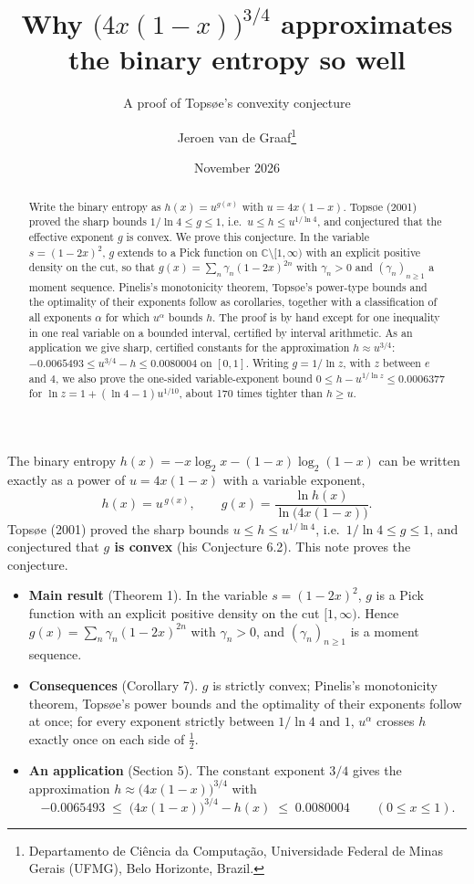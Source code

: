 \documentclass[
  11pt,
]{article}
\title{Why \(\bigl(4x(1-x)\bigr)^{3/4}\) approximates the binary entropy
so well}
\subtitle{A proof of Topsøe's convexity conjecture}
\author{Jeroen van de
Graaf\thanks{Departamento de Ciência da Computação, Universidade Federal de Minas Gerais (UFMG), Belo Horizonte, Brazil.}}
\date{November 2026}
\providecommand{\tightlist}{%
  \setlength{\itemsep}{0pt}\setlength{\parskip}{0pt}}
\begin{document}
\maketitle
\begin{abstract}
Write the binary entropy as \(h(x) = u^{g(x)}\) with \(u = 4x(1-x)\).
Topsøe (2001) proved the sharp bounds \(1/\ln 4 \le g \le 1\),
i.e.~\(u \le h \le u^{1/\ln 4}\), and conjectured that the effective
exponent \(g\) is convex. We prove this conjecture. In the variable
\(s = (1-2x)^2\), \(g\) extends to a Pick function on
\(\mathbb{C} \setminus [1,\infty)\) with an explicit positive density on
the cut, so that \(g(x) = \sum_n \gamma_n (1-2x)^{2n}\) with
\(\gamma_n > 0\) and \((\gamma_n)_{n \ge 1}\) a moment sequence.
Pinelis's monotonicity theorem, Topsøe's power-type bounds and the
optimality of their exponents follow as corollaries, together with a
classification of all exponents \(\alpha\) for which \(u^\alpha\) bounds
\(h\). The proof is by hand except for one inequality in one real
variable on a bounded interval, certified by interval arithmetic. As an
application we give sharp, certified constants for the approximation
\(h \approx u^{3/4}\): \(-0.0065493 \le u^{3/4} - h \le 0.0080004\) on
\([0,1]\). Writing \(g = 1/\ln z\), with \(z\) between \(e\) and \(4\),
we also prove the one-sided variable-exponent bound
\(0 \le h - u^{1/\ln z} \le 0.0006377\) for
\(\ln z = 1 + (\ln 4 - 1)u^{1/10}\), about 170 times tighter than
\(h \ge u\).
\end{abstract}

The binary entropy \(h(x) = -x\log_2 x - (1-x)\log_2(1-x)\) can be
written exactly as a power of \(u = 4x(1-x)\) with a variable exponent,
\[
h(x) = u^{\,g(x)}, \qquad g(x) = \frac{\ln h(x)}{\ln\bigl(4x(1-x)\bigr)} .
\] Topsøe (2001) proved the sharp bounds \(u \le h \le u^{1/\ln 4}\),
i.e.~\(1/\ln 4 \le g \le 1\), and conjectured that \textbf{\(g\) is
convex} (his Conjecture 6.2). This note proves the conjecture.

\begin{itemize}
\tightlist
\item
  \textbf{Main result} (Theorem 1). In the variable \(s = (1-2x)^2\),
  \(g\) is a Pick function with an explicit positive density on the cut
  \([1,\infty)\). Hence \(g(x) = \sum_n \gamma_n (1-2x)^{2n}\) with
  \(\gamma_n > 0\), and \((\gamma_n)_{n\ge1}\) is a moment sequence.
\item
  \textbf{Consequences} (Corollary 7). \(g\) is strictly convex;
  Pinelis's monotonicity theorem, Topsøe's power bounds and the
  optimality of their exponents follow at once; for every exponent
  strictly between \(1/\ln 4\) and \(1\), \(u^\alpha\) crosses \(h\)
  exactly once on each side of \(\tfrac12\).
\item
  \textbf{An application} (Section 5). The constant exponent \(3/4\)
  gives the approximation \(h \approx \bigl(4x(1-x)\bigr)^{3/4}\) with
  \[
  -0.0065493 \;\le\; \bigl(4x(1-x)\bigr)^{3/4} - h(x) \;\le\; 0.0080004 \qquad (0 \le x \le 1).
  \]
\end{itemize}
\end{document}
